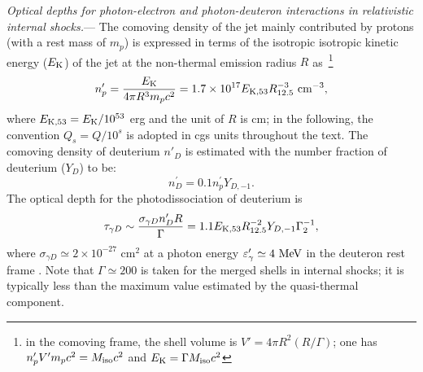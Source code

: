 \documentclass[prd,twocolumn,amsmath,amssymb,aps]{revtex4-2} %
\begin{document}
\textit{Optical depths for photon-electron and photon-deuteron interactions in relativistic internal shocks.}--- The comoving density of the jet mainly contributed by protons (with a rest mass of $m_p$) is expressed in terms of the isotropic isotropic kinetic energy ($E_{\rm K}$) of the jet at the non-thermal emission radius $R$ as~\footnote{in the comoving frame, the shell volume is $V'=4\pi R^2 (R/\Gamma)$; one has $n^{\prime}_{p}V'm_pc^2=M_{\rm iso}c^2$ and $E_{\rm K}=\Gamma M_{\rm iso} c^2$}
\begin{eqnarray}\label{eq:nbp}
 n^{\prime}_{p}=\frac{E_{\rm K}}{4\pi R^3 m_p c^2}\nonumber
     =1.7\times 10^{17} E_{\rm K,53} R_{12.5}^{-3} \ \rm cm^{-3} , \nonumber\\
\end{eqnarray}
where $E_{\rm K,53}=E_{\rm K}/10^{53}$ erg and the unit of $R$ is cm; in the following, the convention $Q_s = Q/10^s$ is adopted in cgs units throughout the text. The comoving density of deuterium $n'_{D}$ is estimated with the number fraction of deuterium ($Y_{D}$) to be:
\begin{equation}\label{eq:nDp}
   n^{\prime}_{ D}= 0.1 n^{\prime}_{p} Y_{D,-1}.
\end{equation}
The optical depth for the photodissociation of deuterium is 
\begin{equation}
  \tau_{\gamma D}\sim\frac{\sigma_{\gamma D} n'_ D R}{\Gamma}=1.1 E_{\rm K, 53} R_{12.5}^{-2} Y_{D,-1} \Gamma_2^{-1},
\end{equation}
where $\sigma_{\gamma D}\simeq 2\times10^{-27}$ cm$^{2}$ at a photon energy
$\varepsilon'_\gamma \simeq 4~{\rm MeV}$ in the deuteron rest frame \cite{IAEA2000}. Note that  $\Gamma\simeq 200$ is taken for the merged shells in internal shocks; it is typically less than the maximum value estimated by the quasi-thermal component.  
\end{document}
